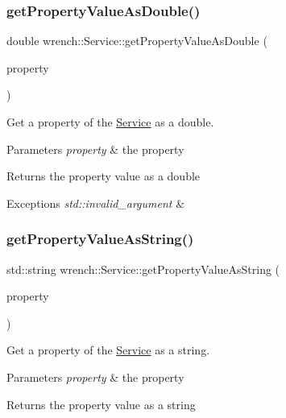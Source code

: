 \subsubsection{\texorpdfstring{get\+Property\+Value\+As\+Double()}{getPropertyValueAsDouble()}}
{\footnotesize\ttfamily double wrench\+::\+Service\+::get\+Property\+Value\+As\+Double (\begin{DoxyParamCaption}\item[{std\+::string}]{property }\end{DoxyParamCaption})}



Get a property of the \hyperlink{classwrench_1_1_service}{Service} as a double. 


\begin{DoxyParams}{Parameters}
{\em property} & the property \\
\hline
\end{DoxyParams}
\begin{DoxyReturn}{Returns}
the property value as a double
\end{DoxyReturn}

\begin{DoxyExceptions}{Exceptions}
{\em std\+::invalid\+\_\+argument} & \\
\hline
\end{DoxyExceptions}
\mbox{\label{classwrench_1_1_service_af7da6bc9cb5d322bfdc6467941f2372f}} 
\subsubsection{\texorpdfstring{get\+Property\+Value\+As\+String()}{getPropertyValueAsString()}}
{\footnotesize\ttfamily std\+::string wrench\+::\+Service\+::get\+Property\+Value\+As\+String (\begin{DoxyParamCaption}\item[{std\+::string}]{property }\end{DoxyParamCaption})}



Get a property of the \hyperlink{classwrench_1_1_service}{Service} as a string. 


\begin{DoxyParams}{Parameters}
{\em property} & the property \\
\hline
\end{DoxyParams}
\begin{DoxyReturn}{Returns}
the property value as a string
\end{DoxyReturn}

